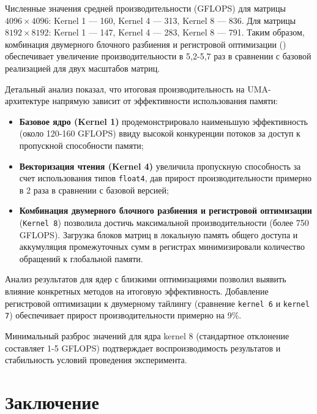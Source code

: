 \documentclass[a4paper]{article}
\begin{document}
Численные значения средней производительности (GFLOPS) для матрицы \(4096 \times 4096\): Kernel 1 --- 160, Kernel 4 --- 313, Kernel 8 --- 836. Для матрицы \(8192 \times 8192\): Kernel 1 --- 147, Kernel 4 --- 283, Kernel 8 --- 791. Таким образом, комбинация двумерного блочного разбиения и регистровой оптимизации () обеспечивает увеличение производительности в 5,2-5,7 раз в сравнении с базовой реализацией для двух масштабов матриц.

Детальный анализ показал, что итоговая производительность на UMA-архитектуре напрямую зависит от эффективности использования памяти:

\begin{itemize}
    \item \textbf{Базовое ядро (Kernel 1)} продемонстрировало наименьшую эффективность (около 120-160 GFLOPS) ввиду высокой конкуренции потоков за доступ к пропускной способности памяти;
    \item \textbf{Векторизация чтения (Kernel 4)} увеличила пропускную способность за счет использования типов \texttt{float4}, дав прирост производительности примерно в 2 раза в сравнении с базовой версией;
    \item \textbf{Комбинация двумерного блочного разбиения и регистровой оптимизации} (\texttt{Kernel 8}) позволила достичь максимальной производительности (более 750 GFLOPS). Загрузка блоков матриц в локальную память общего доступа и аккумуляция промежуточных сумм в регистрах минимизировали количество обращений к глобальной памяти.
\end{itemize}

Анализ результатов для ядер с близкими оптимизациями позволил выявить влияние конкретных методов на итоговую эффективность. Добавление регистровой оптимизации к двумерному тайлингу (сравнение \texttt{kernel 6} и \texttt{kernel 7}) обеспечивает прирост производительности примерно на 9\%.

Минимальный разброс значений для ядра kernel 8 (стандартное отклонение составляет 1-5 GFLOPS) подтверждает воспроизводимость результатов и стабильность условий проведения эксперимента.

\section{Заключение}
\end{document}
